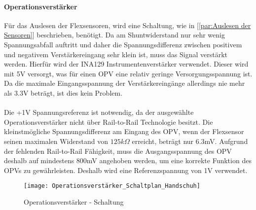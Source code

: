 \documentclass[titlepage,12pt,twoside]{article}
\begin{document}
\paragraph{Operationsverstärker}
\hfill \break
\hfill \break
Für das Auslesen der Flexsensoren, wird eine Schaltung, wie in [\textcolor{blue}{\autoref{par:Auslesen der Sensoren}}] beschrieben, benötigt. Da am
Shuntwiderstand nur sehr wenig Spannungsabfall auftritt und daher die Spannungsdifferenz zwischen positivem und negativem 
Verstärkereingang sehr klein ist, muss das Signal verstärkt werden. Hierfür wird der INA129 Instrumentenverstärker verwendet.
Dieser wird mit 5V versorgt, was für einen OPV eine relativ geringe Versorgungsspannung ist. Da die maximale Eingangsspannung
der Verstärkereingänge allerdings nie mehr als 3.3V beträgt, ist dies kein Problem. \\
\\
Die +1V Spannungsreferenz ist notwendig, da der ausgewählte Operationsverstärker nicht über Rail-to-Rail Technologie besitzt. 
Die kleinstmögliche Spannungsdifferenz am Eingang des OPV, wenn der Flexsensor seinen maximalen Widerstand von
$125k\Omega$ erreicht, beträgt nur 6.3mV. Aufgrund der fehlenden Rail-to-Rail Fähigkeit, muss die Ausgangsspannung des OPV deshalb
auf mindestens 800mV angehoben werden, um eine korrekte Funktion des OPVs zu gewährleisten. Deshalb wird eine Referenzspannung
von 1V verwendet. \\
\begin{figure}[H]
	\begin{center}
		\scalebox{0.5}
		{\texttt{[image: Operationsverstärker\_Schaltplan\_Handschuh]}}
		\caption{Operationsverstärker - Schaltung}
		\label{fig:Operationsverstärker_Schaltplan_Handschuh}		
	\end{center}
\end{figure}
\end{document}

